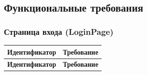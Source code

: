\documentclass[a4paper, 14pt]{article}
\begin{document}
\subsection{Функциональные требования}

\subsubsection{Страница входа (LoginPage)}

\begin{longtable}{| p{} | p{} |}
    \hline
    \textbf{Идентификатор}          & \textbf{Требование}                                                                                                                                                                \\
    \hline
    \endfirsthead
    \hline
    \textbf{Идентификатор}          & \textbf{Требование}                                                                                                                                                                \\
    \hline
    \endhead


\end{longtable}
\end{document}
